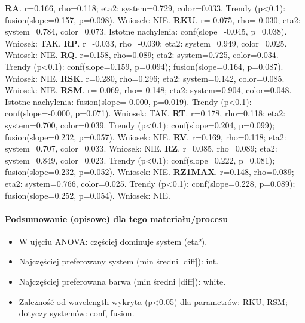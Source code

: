 \documentclass[
  10pt,
]{article}
\begin{document}
\textbf{RA}. r=0.166, rho=0.118; eta2: system=0.729, color=0.033. Trendy
(p\textless0.1): fusion(slope=0.157, p=0.098). Wniosek: NIE.
\textbf{RKU}. r=-0.075, rho=-0.030; eta2: system=0.784, color=0.073.
Istotne nachylenia: conf(slope=-0.045, p=0.038). Wniosek: TAK.
\textbf{RP}. r=-0.033, rho=-0.030; eta2: system=0.949, color=0.025.
Wniosek: NIE. \textbf{RQ}. r=0.158, rho=0.089; eta2: system=0.725,
color=0.034. Trendy (p\textless0.1): conf(slope=0.159, p=0.094);
fusion(slope=0.164, p=0.087). Wniosek: NIE. \textbf{RSK}. r=0.280,
rho=0.296; eta2: system=0.142, color=0.085. Wniosek: NIE. \textbf{RSM}.
r=-0.069, rho=-0.148; eta2: system=0.904, color=0.048. Istotne
nachylenia: fusion(slope=-0.000, p=0.019). Trendy (p\textless0.1):
conf(slope=-0.000, p=0.071). Wniosek: TAK. \textbf{RT}. r=0.178,
rho=0.118; eta2: system=0.700, color=0.039. Trendy (p\textless0.1):
conf(slope=0.204, p=0.099); fusion(slope=0.232, p=0.057). Wniosek: NIE.
\textbf{RV}. r=0.169, rho=0.118; eta2: system=0.707, color=0.033.
Wniosek: NIE. \textbf{RZ}. r=0.085, rho=0.089; eta2: system=0.849,
color=0.023. Trendy (p\textless0.1): conf(slope=0.222, p=0.081);
fusion(slope=0.232, p=0.052). Wniosek: NIE. \textbf{RZ1MAX}. r=0.148,
rho=0.089; eta2: system=0.766, color=0.025. Trendy (p\textless0.1):
conf(slope=0.228, p=0.089); fusion(slope=0.252, p=0.054). Wniosek: NIE.

\paragraph{Podsumowanie (opisowe) dla tego materiału/procesu}
\begin{itemize}
\item W ujęciu ANOVA: częściej dominuje system (eta²).
\item Najczęściej preferowany system (min średni |diff|): int.
\item Najczęściej preferowana barwa (min średni |diff|): white.
\item Zależność od wavelength wykryta (p<0.05) dla parametrów: RKU, RSM; dotyczy systemów: conf, fusion.
\end{itemize}
\end{document}

